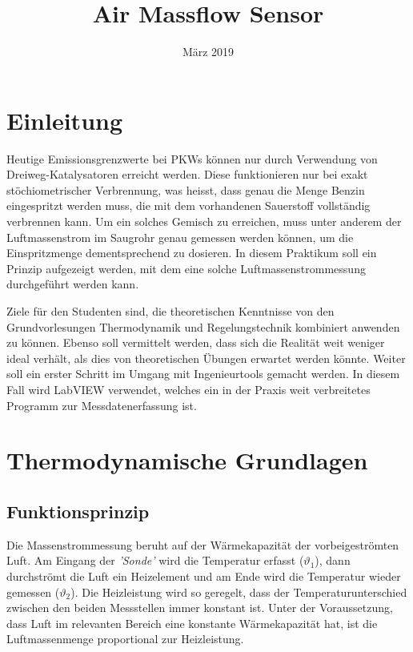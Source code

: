 \documentclass[a4paper,10pt,oneside]{article}
\title{Air Massflow Sensor}
\date{März 2019}
\begin{document}
\maketitle
\mbox{}
\thispagestyle{empty}
\newpage
\pagestyle{plain}

\tableofcontents

\newpage

\section{Einleitung}
Heutige Emissionsgrenzwerte bei PKWs können nur durch Verwendung von Dreiweg-Katalysatoren erreicht werden. Diese funktionieren nur bei exakt stöchiometrischer Verbrennung, was heisst, dass genau die Menge Benzin eingespritzt werden muss, die mit dem vorhandenen Sauerstoff vollständig verbrennen kann. Um ein solches Gemisch zu erreichen, muss unter anderem der Luftmassenstrom im Saugrohr genau gemessen werden können, um die Einspritzmenge dementsprechend zu dosieren. In diesem Praktikum soll ein Prinzip aufgezeigt werden, mit dem eine solche Luftmassenstrommessung durchgeführt werden kann.

Ziele für den Studenten sind, die theoretischen Kenntnisse von den Grundvorlesungen Thermodynamik und Regelungstechnik kombiniert anwenden zu können. Ebenso soll vermittelt werden, dass sich die Realität weit weniger ideal verhält, als dies von theoretischen Übungen erwartet werden könnte.
Weiter soll ein erster Schritt im Umgang mit Ingenieurtools gemacht werden. In diesem Fall wird LabVIEW verwendet, welches ein in der Praxis weit verbreitetes Programm zur Messdatenerfassung ist.


%
\section{Thermodynamische Grundlagen}

\subsection{Funktionsprinzip}
Die Massenstrommessung beruht auf der Wärmekapazität der vorbeigeströmten Luft. Am Eingang der \textit{'Sonde'} wird die Temperatur erfasst ($\vartheta_1$), dann durchströmt die Luft ein Heizelement und am Ende wird die Temperatur wieder gemessen ($\vartheta_2$). Die Heizleistung wird so geregelt, dass der Temperaturunterschied zwischen den beiden Messstellen immer konstant ist. Unter der Voraussetzung, dass Luft im relevanten Bereich eine konstante Wärmekapazität hat, ist die Luftmassenmenge proportional zur Heizleistung. 
\end{document}
